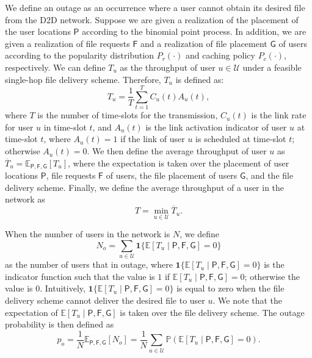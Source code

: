 \documentclass[journal,draftclsnofoot,onecolumn,12pt,twoside]{IEEEtran}
\begin{document}
We define an outage as an occurrence where a user cannot obtain its desired file from the D2D network. Suppose we are given a realization of the placement of the user locations $\mathsf{P}$ according to the binomial point process. In addition, we are given a realization of file requests $\mathsf{F}$ and a realization of file placement $\mathsf{G}$ of users according to the popularity distribution $P_r(\cdot)$ and caching policy $P_c(\cdot)$, respectively. We can define $T_u$ as the throughput of user $u\in\mathcal{U}$ under a feasible single-hop file delivery scheme. Therefore, $T_u$ is defined as:
\begin{equation}
T_u=\frac{1}{T}\sum_{t=1}^T C_{u}(t)A_u(t),
\end{equation}
where $T$ is the number of time-slots for the transmission, $C_{u}(t)$ is the link rate for user $u$ in time-slot $t$, and $A_u(t)$ is the link activation indicator of user $u$ at time-slot $t$, where $A_u(t)=1$ if the link of user $u$ is scheduled at time-slot $t$; otherwise $A_u(t)=0$. We then define the average throughput of user $u$ as $\overline{T}_u=\mathbb{E}_{\mathsf{P},\mathsf{F},\mathsf{G}}[T_u]$, where the expectation is taken over the placement of user locations $\mathsf{P}$, file requests $\mathsf{F}$ of users, the file placement of users $\mathsf{G}$, and the file delivery scheme. Finally, we define the average throughput of a user in the network as
\begin{equation}\label{eq:throu_def}
T=\displaystyle{\min_{u\in\mathcal{U}}\overline{T}_{u}}.
\end{equation}

When the number of users in the network is $N$, we define
\begin{equation}
N_o=\displaystyle{\sum_{u\in\mathcal{U}}}\mathbf{1}\lbrace\mathbb{E}[T_u\mid \mathsf{P},\mathsf{F},\mathsf{G}]=0\rbrace
\end{equation}
as the number of users that in outage, where $\mathbf{1}\lbrace\mathbb{E}[T_u\mid \mathsf{P},\mathsf{F},\mathsf{G}]=0\rbrace$ is the indicator function such that the value is $1$ if $\mathbb{E}[T_u\mid \mathsf{P},\mathsf{F},\mathsf{G}]=0$; otherwise the value is $0$. Intuitively, $\mathbf{1}\lbrace\mathbb{E}[T_u\mid \mathsf{P},\mathsf{F},\mathsf{G}]=0\rbrace$ is equal to zero when the file delivery scheme cannot deliver the desired file to user $u$. We note that the expectation of $\mathbb{E}[T_u\mid \mathsf{P},\mathsf{F},\mathsf{G}]$ is taken over the file delivery scheme. The outage probability is then defined as
\begin{equation}
p_o=\frac{1}{N}\mathbb{E}_{\mathsf{P},\mathsf{F},\mathsf{G}}[N_o]=\frac{1}{N}\sum_{u\in\mathcal{U}}\mathbb{P}\left(\mathbb{E}[T_u\mid \mathsf{P},\mathsf{F},\mathsf{G}]=0\right).
\end{equation}
\end{document}

